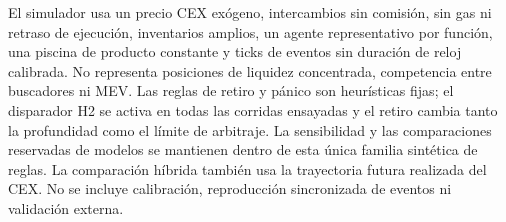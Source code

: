 El simulador usa un precio CEX exógeno, intercambios sin comisión, sin gas ni retraso de ejecución, inventarios amplios, un agente representativo por función, una piscina de producto constante y ticks de eventos sin duración de reloj calibrada. No representa posiciones de liquidez concentrada, competencia entre buscadores ni MEV. Las reglas de retiro y pánico son heurísticas fijas; el disparador H2 se activa en todas las corridas ensayadas y el retiro cambia tanto la profundidad como el límite de arbitraje. La sensibilidad y las comparaciones reservadas de modelos se mantienen dentro de esta única familia sintética de reglas. La comparación híbrida también usa la trayectoria futura realizada del CEX. No se incluye calibración, reproducción sincronizada de eventos ni validación externa.
